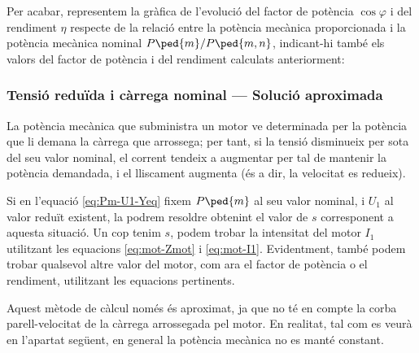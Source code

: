 \begin{exemple}
	Per acabar, representem  la gràfica de l'evolució del factor de potència $\cos\varphi$ i del rendiment $\eta$  respecte de la relació entre la potència mecànica proporcionada i la potència mecànica nominal $P\ped{m}/P\ped{m,n}$, indicant-hi també els valors del factor de potència i del rendiment calculats anteriorment:
	\begin{center}
		
	\end{center}

\end{exemple}
	
\subsubsection{Tensió reduïda i càrrega nominal --- Solució aproximada}

La potència mecànica que subministra un motor ve determinada per la potència que li demana la càrrega que arrossega; per tant, si la tensió disminueix per sota del seu valor nominal, el corrent tendeix a augmentar per tal de mantenir la potència demandada, i el lliscament augmenta (és a dir, la velocitat es redueix).

Si en l'equació \eqref{eq:Pm-U1-Yeq} fixem $P\ped{m}$ al seu valor nominal, i $U_1$ al valor reduït existent, la podrem resoldre obtenint el valor de $s$ corresponent  a aquesta situació. Un cop tenim $s$, podem trobar la intensitat del motor $I_1$ utilitzant les equacions \eqref{eq:mot-Zmot} i \eqref{eq:mot-I1}. Evidentment, també podem trobar qualsevol altre valor del motor, com  ara el factor de potència o el rendiment, utilitzant les equacions pertinents.

Aquest mètode de càlcul només és aproximat, ja que no té en compte la corba parell-velocitat de la càrrega arrossegada pel motor. En realitat, tal com es veurà en l'apartat següent, en general la potència mecànica no es manté constant.

